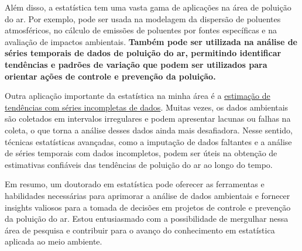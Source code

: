 \documentclass[12pt,a4paper]{article}
\begin{document}
	Além disso, a estatística tem uma vasta gama de aplicações na área de poluição do ar. Por exemplo, pode ser usada na modelagem da dispersão de poluentes atmosféricos, no cálculo de emissões de poluentes por fontes específicas e na avaliação de impactos ambientais. \textbf{Também pode ser utilizada na análise de séries temporais de dados de poluição do ar, permitindo identificar tendências e padrões de variação que podem ser utilizados para orientar ações de controle e prevenção da poluição.}
	
	Outra aplicação importante da estatística na minha área é a \underline{estimação de tendências com séries incompletas de dados}. Muitas vezes, os dados ambientais são coletados em intervalos irregulares e podem apresentar lacunas ou falhas na coleta, o que torna a análise desses dados ainda mais desafiadora. Nesse sentido, técnicas estatísticas avançadas, como a imputação de dados faltantes e a análise de séries temporais com dados incompletos, podem ser úteis na obtenção de estimativas confiáveis das tendências de poluição do ar ao longo do tempo.
	
	Em resumo, um doutorado em estatística pode oferecer as ferramentas e habilidades necessárias para aprimorar a análise de dados ambientais e fornecer insights valiosos para a tomada de decisões em projetos de controle e prevenção da poluição do ar. Estou entusiasmado com a possibilidade de mergulhar nessa área de pesquisa e contribuir para o avanço do conhecimento em estatística aplicada ao meio ambiente.
	
	\label{LastPage}
\end{document}
